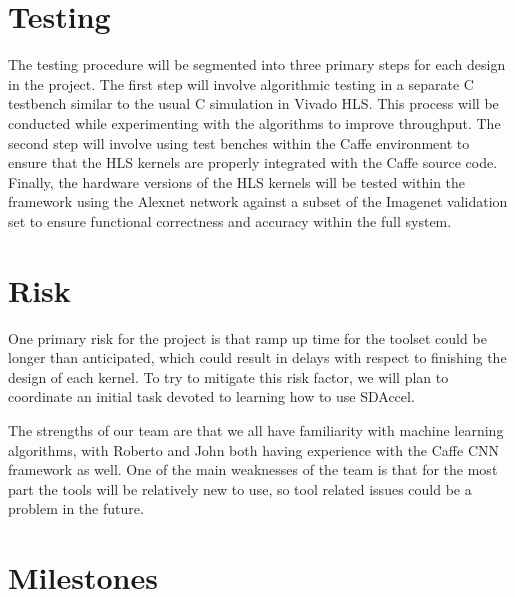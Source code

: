 \documentclass[conference,compsoc]{IEEEtran/IEEEtran}
\begin{document}
\section{Testing}\label{section:testing}

The testing procedure will be segmented into three primary steps for each design in the project.
The first step will involve algorithmic testing in a separate C testbench similar to the usual C
simulation in Vivado HLS. This process will be conducted while experimenting with the algorithms
to improve throughput. The second step will involve using test benches within the Caffe environment
to ensure that the HLS kernels are properly integrated with the Caffe source code. Finally, the
hardware versions of the HLS kernels will be tested within the framework using the Alexnet network
against a subset of the Imagenet validation set to ensure functional correctness and accuracy
within the full system.

\section{Risk}\label{section:risk}

One primary risk for the project is that ramp up time for the toolset could be longer than 
anticipated, which could result in delays with respect to finishing the design of each kernel. 
To try to mitigate this risk factor, we will plan to coordinate an initial task devoted to
learning how to use SDAccel. 

The strengths of our team are that we all have familiarity with machine learning algorithms,
with Roberto and John both having experience with the Caffe CNN framework as well. One of the 
main weaknesses of the team is that for the most part the tools will be relatively new to use,
so tool related issues could be a problem in the future. 

\section{Milestones}\label{section:milestones}
\end{document}

